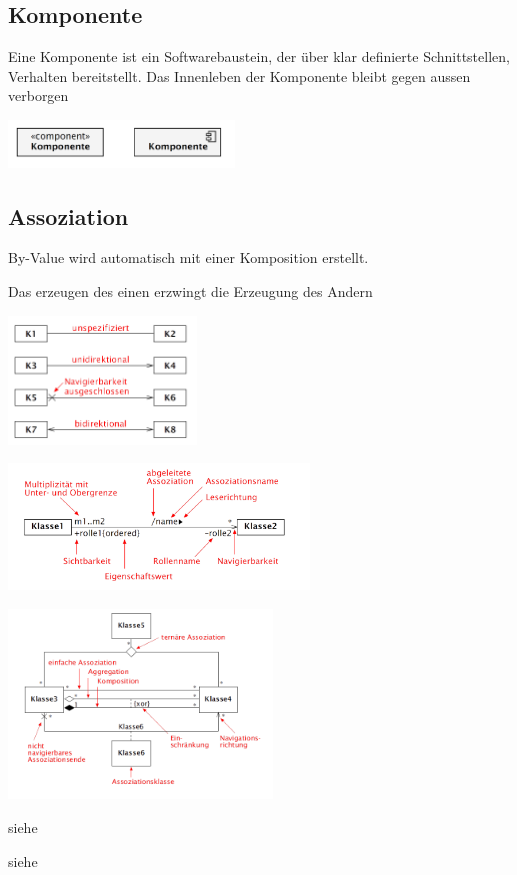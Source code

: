 \subsection{Komponente }
  \begin{minipage}{12cm}
    Eine Komponente ist ein Softwarebaustein, der über klar definierte Schnittstellen, Verhalten bereitstellt.
    Das Innenleben der Komponente bleibt gegen aussen verborgen
  \end{minipage}
  \begin{minipage}{6cm}
    \includegraphics[width=6cm]{./bilder/Komponente.png}
  \end{minipage}
  

\subsection{Assoziation }
  By-Value wird automatisch mit einer Komposition erstellt.
  \begin{description}[leftmargin=3.5cm]
    \item[Navigierbarkeit]
      \parbox{5cm}{Das erzeugen des einen erzwingt die Erzeugung des Andern}
      \hspace{0.5cm}
      \parbox{5cm}{\includegraphics[width=5cm]{./bilder/Navigierbarkeit.png}}
    \item[Notation]
      \parbox{8cm}{\includegraphics[width=8cm]{./bilder/Notation_Assozi_1.png}}
      \parbox{7cm}{\includegraphics[width=7cm]{./bilder/Notation_Assozi_2.png}}
    \item[Eigenschaftswerte]
      siehe 
    \item[Implementation]
      siehe 
  \end{description}

